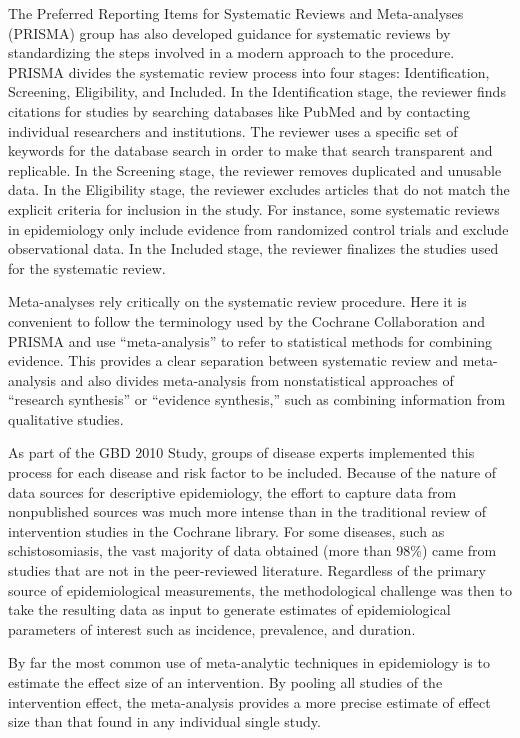 The Preferred Reporting Items for Systematic Reviews and Meta-analyses
(PRISMA) group has also developed guidance for systematic reviews by
standardizing the steps involved in a modern approach to
the procedure.\cite{moher_preferred_2009} PRISMA divides the systematic
review process into four stages: Identification, Screening,
Eligibility, and Included.  In the Identification stage, the reviewer
finds citations for studies by searching databases like PubMed and by
contacting individual researchers and institutions. The reviewer uses
a specific set of keywords for the database search in order to make
that search transparent and replicable. In the Screening stage, the
reviewer removes duplicated and unusable data. In the Eligibility stage,
the reviewer excludes articles that do not match the explicit criteria
for inclusion in the study. For instance, some systematic reviews in
epidemiology only include evidence from randomized control trials and
exclude observational data. In the Included stage, the reviewer
finalizes the studies used for the systematic review.

Meta-analyses rely critically on the systematic review procedure. Here
it is convenient to follow the terminology used by the Cochrane
Collaboration and PRISMA and use ``meta-analysis'' to refer to
statistical methods for combining evidence.  This provides a clear
separation between systematic review and meta-analysis and also divides
meta-analysis from nonstatistical approaches of ``research
synthesis'' or ``evidence synthesis,'' such as combining information
from qualitative studies.

As part of the GBD 2010 Study, groups of disease experts implemented
this process for each disease and risk factor to be
included. Because of the nature of data sources for descriptive
epidemiology, the effort to capture data from nonpublished sources
was much more intense than in the traditional review of
intervention studies in the Cochrane library.  For some diseases, such
as schistosomiasis, the vast majority of data obtained (more than
98\%) came from studies that are not in the peer-reviewed literature.
Regardless of the primary source of epidemiological measurements, the
methodological challenge was then to take the resulting data as input
to generate estimates of epidemiological parameters of interest such
as incidence, prevalence, and duration.

By far the most common use of meta-analytic techniques in epidemiology is to estimate
the effect size of an intervention.  By pooling all studies of the
intervention effect, the meta-analysis provides a more precise
estimate of effect size than that found in any individual single
study.

